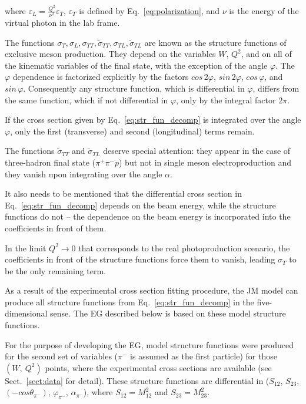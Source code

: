 where $\varepsilon_{L} = \frac{Q^2}{\nu^2}\varepsilon_{T}$, $\varepsilon_{T}$ is defined by Eq.~\eqref{eq:polarization}, and $\nu$ is the energy of the virtual photon in the lab frame.


The functions $\sigma_{T}, \sigma_{L}, \sigma_{TT}, \widetilde{\sigma}_{TT}, \sigma _{TL}, \widetilde{\sigma}_{TL}$  are known as the structure functions of exclusive meson production. They depend on the variables $W$, $Q^2$, and on all of the kinematic variables of the final state, with the exception of the angle $\varphi$. The $\varphi$ dependence is factorized explicitly by the factors $cos\, 2\varphi$, $sin\, 2\varphi$, $cos\, \varphi$, and $sin\, \varphi$. Consequently any structure function, which is differential in $\varphi$, differs from the same function, which if not differential in $\varphi$, only by the integral factor $2\pi$.

If the cross section given by Eq.~\eqref{eq:str_fun_decomp} is integrated over the angle $\varphi$, only the first (transverse) and second (longitudinal) terms remain.

The functions $\widetilde{\sigma}_{TT}$ and $\widetilde{\sigma}_{TL}$ deserve  special attention: they appear in the case of three-hadron final state ($\pi^+ \pi^- p$) but not in single meson electroproduction and they vanish upon integrating over the angle $\alpha$. 


It also needs to be mentioned that the differential cross section in Eq.~\eqref{eq:str_fun_decomp} depends on the beam energy, while the structure functions do not -- the dependence on the beam energy is incorporated into the coefficients in front of them. 

In the limit $Q^2 \rightarrow 0$ that corresponds to the real photoproduction scenario, the coefficients in front of the structure functions force them to vanish, leading $\sigma_{T}$ to be the only remaining term.

As a result of the experimental cross section fitting procedure, the JM model can produce all structure functions from Eq.~\eqref{eq:str_fun_decomp} in the five-dimensional sense. The EG described below is based on these model structure functions.



For the purpose of developing the EG, model structure functions were produced for the second set of variables ($\pi^{-}$ is assumed as the first particle) for those $(W,~Q^2)$ points, where the experimental cross sections are available (see Sect.~\ref{sect:data} for detail). These structure functions are differential in  ($S_{12}$, $S_{23}$, $(-cos\theta_{\pi^{-}})$, $\varphi_{\pi^{-}}$, $\alpha_{\pi^{-}}$), where $S_{12} = M_{12}^{2}$ and $S_{23} = M_{23}^{2}$. 

